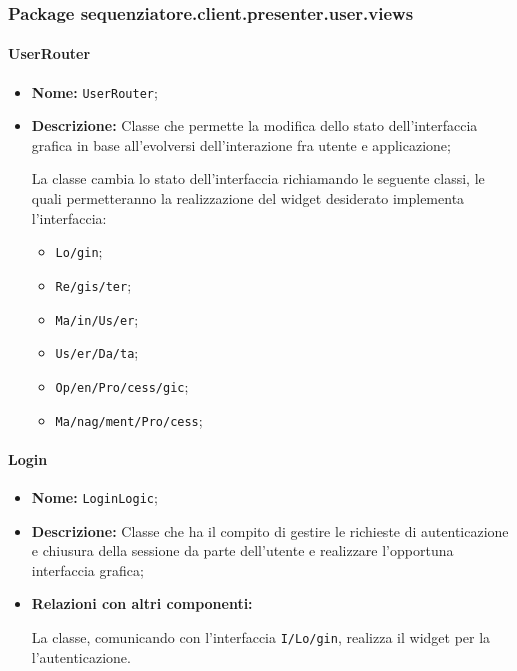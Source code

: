 \subsubsection{Package sequenziatore.client.presenter.user.views}

\paragraph{UserRouter}
\begin{flushleft}
\begin{itemize}
\item \textbf{Nome:} \texttt{UserRouter};
\item \textbf{Descrizione:} Classe che permette la modifica dello stato dell'interfaccia grafica in base all'evolversi dell'interazione fra utente e applicazione;
\begin{sloppypar}
La classe cambia lo stato dell'interfaccia richiamando le seguente classi, le quali permetteranno la realizzazione del widget desiderato implementa l'interfaccia:
\end{sloppypar}
\begin{itemize}
\item \texttt{Lo\fshyp{}gin};
\item \texttt{Re\fshyp{}gis\fshyp{}ter};
\item \texttt{Ma\fshyp{}in\fshyp{}Us\fshyp{}er};
\item \texttt{Us\fshyp{}er\fshyp{}Da\fshyp{}ta};
\item \texttt{Op\fshyp{}en\fshyp{}Pro\fshyp{}cess\fshyp{}gic};
\item \texttt{Ma\fshyp{}nag\fshyp{}ment\fshyp{}Pro\fshyp{}cess};
\end{itemize}
\end{itemize}
\end{flushleft}

\paragraph{Login}
\begin{flushleft}
\begin{itemize}
\item \textbf{Nome:} \texttt{LoginLogic};
\item \textbf{Descrizione:} Classe che ha il compito di gestire le richieste di autenticazione e chiusura della sessione da parte dell'utente e realizzare l'opportuna interfaccia grafica;
\item \textbf{Relazioni con altri componenti:}
\begin{sloppypar}
La classe, comunicando con l'interfaccia \texttt{I\fshyp{}Lo\fshyp{}gin}, realizza il widget per la l'autenticazione.
\end{sloppypar}
\end{itemize}
\end{flushleft}

